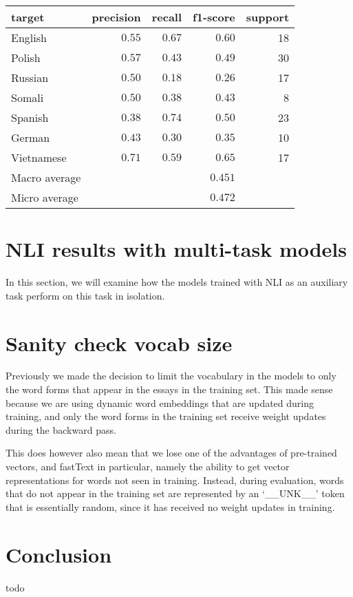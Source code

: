 \begin{table}
  \centering
  \begin{tabular}{lrrrr}
    \toprule
    target   & precision &  recall & f1-score & support \\
    \midrule
    English    &   $0.55$  &   $0.67$   &  $0.60$  &     18 \\
    Polish     &   $0.57$  &   $0.43$   &  $0.49$  &     30 \\
    Russian    &   $0.50$  &   $0.18$   &  $0.26$  &     17 \\
    Somali     &   $0.50$  &   $0.38$   &  $0.43$  &      8 \\
    Spanish    &   $0.38$  &   $0.74$   &  $0.50$  &     23 \\
    German     &   $0.43$  &   $0.30$   &  $0.35$  &     10 \\
    Vietnamese &   $0.71$  &   $0.59$   &  $0.65$  &     17 \\
    \midrule
    Macro average &     &      &           $0.451$ & \\
    Micro average &     &      &           $0.472$ & \\
    \bottomrule
  \end{tabular}
  \caption{}
\end{table}

\section{NLI results with multi-task models}

In this section, we will examine how the models trained with \ac{NLI} as
an auxiliary task perform on this task in isolation.


\section{Sanity check vocab size}

Previously we made the decision to limit the vocabulary in the models to only
the word forms that appear in the essays in the training set. This made sense
because we are using dynamic word embeddings that are updated during
training, and only the word forms in the training set receive weight updates
during the backward pass.

This does however also mean that we lose one of the advantages of pre-trained
vectors, and fastText in particular, namely the ability to get vector
representations for words not seen in training. Instead, during evaluation,
words that do not appear in the training set are represented by an
`\_\_UNK\_\_' token that is essentially random, since it has received no
weight updates in training.




\section{Conclusion}

todo
